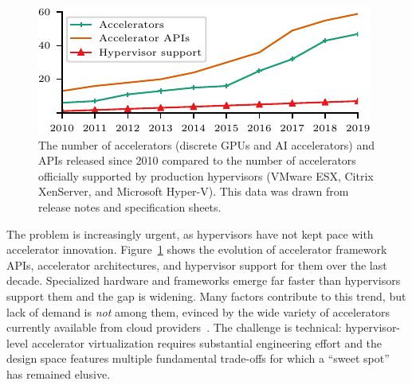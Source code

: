 \begin{figure}[!htp]
	\centering
	\includegraphics[width=\linewidth]{ava/data/technology_trend/technology_trend.pdf}%
	\caption{The number of accelerators (discrete GPUs and AI
      accelerators) and APIs released since 2010 compared to the number of accelerators officially supported by production hypervisors (VMware ESX, Citrix XenServer, and Microsoft Hyper-V).
      This data was drawn from release notes and specification sheets.
  }
	\label{fig:trends}
\end{figure}

The problem is increasingly urgent, as hypervisors have not kept pace with accelerator innovation.
Figure~\ref{fig:trends} shows the evolution of accelerator framework APIs, accelerator architectures, and hypervisor
support for them over the last decade. Specialized hardware and frameworks
emerge far faster than hypervisors support them and the gap is widening.
Many factors contribute to this trend, but lack of demand is \emph{not} among them,
evinced by the wide variety of accelerators currently available from cloud providers~\cite{amazon_ec2,google-gpu,google-cmle,gpucloud,amazon_f1,olympus,cloud-tpu}.
The challenge is technical: hypervisor-level accelerator virtualization requires substantial engineering effort and the design space features multiple
fundamental trade-offs for which a ``sweet spot'' has remained elusive.

